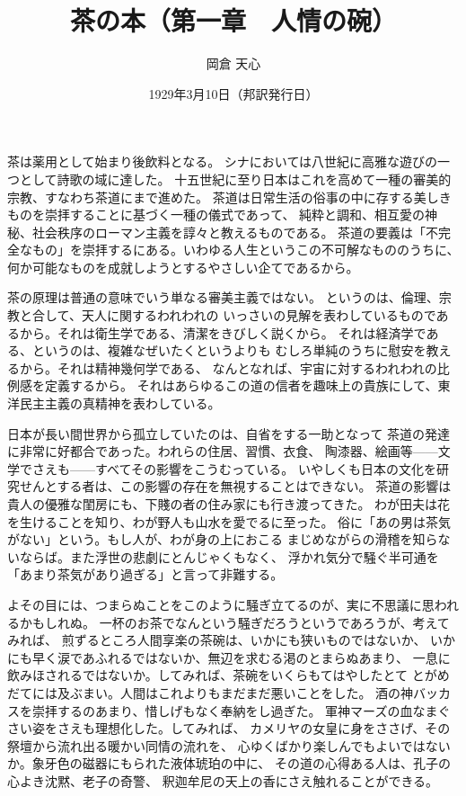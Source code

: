 \documentclass[a4paper, platex, dvipdfmx]{jsarticle}
\title{茶の本（第一章　人情の碗）}
\author{岡倉 天心}
\date{1929年3月10日（邦訳発行日）}
\begin{document}
\maketitle

茶は薬用として始まり後飲料となる。
シナにおいては八世紀に高雅な遊びの一つとして詩歌の域に達した。
十五世紀に至り日本はこれを高めて一種の審美的宗教、すなわち茶道にまで進めた。
茶道は日常生活の俗事の中に存する美しきものを崇拝することに基づく一種の儀式であって、
純粋と調和、相互愛の神秘、社会秩序のローマン主義を諄々と教えるものである。
茶道の要義は「不完全なもの」を崇拝するにある。いわゆる人生というこの不可解なもののうちに、
何か可能なものを成就しようとするやさしい企てであるから。

茶の原理は普通の意味でいう単なる審美主義ではない。
というのは、倫理、宗教と合して、天人に関するわれわれの
いっさいの見解を表わしているものであるから。それは衛生学である、清潔をきびしく説くから。
それは経済学である、というのは、複雑なぜいたくというよりも
むしろ単純のうちに慰安を教えるから。それは精神幾何学である、
なんとなれば、宇宙に対するわれわれの比例感を定義するから。
それはあらゆるこの道の信者を趣味上の貴族にして、東洋民主主義の真精神を表わしている。

日本が長い間世界から孤立していたのは、自省をする一助となって
茶道の発達に非常に好都合であった。われらの住居、習慣、衣食、
陶漆器、絵画等——文学でさえも——すべてその影響をこうむっている。
いやしくも日本の文化を研究せんとする者は、この影響の存在を無視することはできない。
茶道の影響は貴人の優雅な閨房にも、下賤の者の住み家にも行き渡ってきた。
わが田夫は花を生けることを知り、わが野人も山水を愛でるに至った。
俗に「あの男は茶気がない」という。もし人が、わが身の上におこる
まじめながらの滑稽を知らないならば。また浮世の悲劇にとんじゃくもなく、
浮かれ気分で騒ぐ半可通を「あまり茶気があり過ぎる」と言って非難する。

よその目には、つまらぬことをこのように騒ぎ立てるのが、実に不思議に思われるかもしれぬ。
一杯のお茶でなんという騒ぎだろうというであろうが、考えてみれば、
煎ずるところ人間享楽の茶碗は、いかにも狭いものではないか、
いかにも早く涙であふれるではないか、無辺を求むる渇のとまらぬあまり、
一息に飲みほされるではないか。してみれば、茶碗をいくらもてはやしたとて
とがめだてには及ぶまい。人間はこれよりもまだまだ悪いことをした。
酒の神バッカスを崇拝するのあまり、惜しげもなく奉納をし過ぎた。
軍神マーズの血なまぐさい姿をさえも理想化した。してみれば、
カメリヤの女皇に身をささげ、その祭壇から流れ出る暖かい同情の流れを、
心ゆくばかり楽しんでもよいではないか。象牙色の磁器にもられた液体琥珀の中に、
その道の心得ある人は、孔子の心よき沈黙、老子の奇警、
釈迦牟尼の天上の香にさえ触れることができる。
\end{document}
